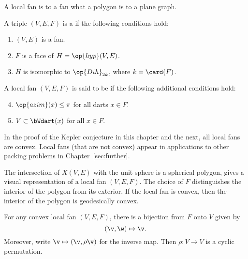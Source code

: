 A local fan is to a fan what a polygon is to a plane graph.  


\begin{definition} \label{def:convex-local}
A triple $(V,E,F)$ is a  if the following conditions hold:
\begin{enumerate} 
\item {} $(V,E)$ is a fan.
\item {} $F$ is a face of $H = \op{hyp}(V,E)$.
\item {} $H$ is isomorphic to $\op{Dih}_{2k}$, where $k =
\card(F)$.
\end{enumerate}
A local fan $(V,E,F)$ is said to be  if the following
additional conditions hold:
\begin{enumerate}
\setcounter{enumi}{3}
\item %
 $\op{azim}(x)\le \pi$ for all darts $x\in F$.
\item {} $V\subset \bWdart(x)$ for all $x\in F$.
\end{enumerate}
\end{definition}
%

In the proof of the Kepler conjecture in this chapter and the next,
all local fans are convex.  Local fans (that are not convex) appear in
applications to other packing problems in Chapter~\ref{sec:further}.

\begin{remark}[visualization]
  The intersection of $X(V,E)$ with the unit sphere is a spherical
  polygon, gives a visual representation of a local fan $(V,E,F)$.
  The choice of $F$ distinguishes the interior of the polygon from its
  exterior.  If the local fan is convex, then the interior of the
  polygon is geodesically convex.
\end{remark}


\begin{lemma}[]  
For any convex local fan $(V,E,F)$, there is a bijection from $F$ onto $V$
given by
\[ 
(\v,\w) \mapsto \v.
\] 
Moreover, write $\v\mapsto(\v,\rho\v)$ for the inverse map. 
Then $\rho:V\to V$ is a cyclic permutation.
\end{lemma}
%

